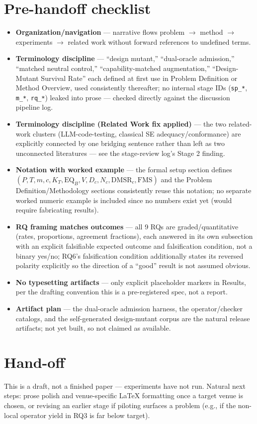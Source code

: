 \documentclass[11pt]{article}
\begin{document}
\section*{Pre-handoff checklist}
\begin{itemize}[leftmargin=1.4em]
\item \textbf{Organization/navigation} --- narrative flows problem $\to$ method $\to$ experiments $\to$ related work without forward references to undefined terms.
\item \textbf{Terminology discipline} --- ``design mutant,'' ``dual-oracle admission,'' ``matched neutral control,'' ``capability-matched augmentation,'' ``Design-Mutant Survival Rate'' each defined at first use in Problem Definition or Method Overview, used consistently thereafter; no internal stage IDs (\texttt{sp\_*}, \texttt{m\_*}, \texttt{rq\_*}) leaked into prose --- checked directly against the discussion pipeline log.
\item \textbf{Terminology discipline (Related Work fix applied)} --- the two related-work clusters (LLM-code-testing, classical SE adequacy/conformance) are explicitly connected by one bridging sentence rather than left as two unconnected literatures --- see the stage-review log's Stage 2 finding.
\item \textbf{Notation with worked example} --- the formal setup section defines $(P, T, m, c, K_T, \mathrm{EQ}_B, V, D_c, N_c, \mathrm{DMSR}_c, \mathrm{FMS})$ and the Problem Definition/Methodology sections consistently reuse this notation; no separate worked numeric example is included since no numbers exist yet (would require fabricating results).
\item \textbf{RQ framing matches outcomes} --- all 9 RQs are graded/quantitative (rates, proportions, agreement fractions), each answered in its own subsection with an explicit falsifiable expected outcome and falsification condition, not a binary yes/no; RQ6's falsification condition additionally states its reversed polarity explicitly so the direction of a ``good'' result is not assumed obvious.
\item \textbf{No typesetting artifacts} --- only explicit placeholder markers in Results, per the drafting convention this is a pre-registered spec, not a report.
\item \textbf{Artifact plan} --- the dual-oracle admission harness, the operator/checker catalogs, and the self-generated design-mutant corpus are the natural release artifacts; not yet built, so not claimed as available.
\end{itemize}

\section*{Hand-off}
This is a draft, not a finished paper --- experiments have not run. Natural next steps: prose polish and venue-specific LaTeX formatting once a target venue is chosen, or revising an earlier stage if piloting surfaces a problem (e.g., if the non-local operator yield in RQ3 is far below target).
\end{document}
